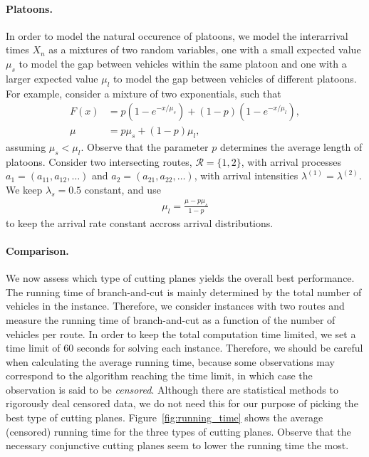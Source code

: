 \documentclass[a4paper]{report}
\theoremstyle{definition}
\theoremstyle{plain}
\begin{document}
\paragraph{Platoons.}
In order to model the natural occurence of platoons, we model the interarrival
times $X_{n}$ as a mixtures of two random variables, one with a small expected
value $\mu_{s}$ to model the gap between vehicles within the same platoon and one
with a larger expected value $\mu_{l}$ to model the gap between vehicles of
different platoons. For example, consider a mixture of two exponentials, such
that
\begin{align*}
  F(x) &= p ( 1 - e^{-x / \mu_{s}} ) + (1 - p) (1 - e^{-x / \mu_{l}}) , \\[0.2em]
  \mu &= p \mu_{s} + (1-p) \mu_{l} ,
\end{align*}
%
assuming $\mu_{s} < \mu_{l}$. Observe that the parameter $p$ determines
the average length of platoons.
%
Consider two intersecting routes, $\mathcal{R} = \{1, 2\}$, with arrival processes
$a_{1} = (a_{11}, a_{12}, \dots)$ and $a_{2} = (a_{21}, a_{22}, \dots)$, with
arrival intensities $\lambda^{(1)} = \lambda^{(2)}$.
%
We keep $\lambda_{s} = 0.5$ constant, and use
\begin{align*}
  \mu_{l}  = \frac{\mu - p \mu_{s}}{1 - p}
\end{align*}
to keep the arrival rate constant accross arrival distributions.

\paragraph{Comparison.}
We now assess which type of cutting planes yields the overall best performance.
The running time of branch-and-cut is mainly determined by the total number of
vehicles in the instance. Therefore, we consider instances with two routes and
measure the running time of branch-and-cut as a function of the number of
vehicles per route.
%
In order to keep the total computation time limited, we set a time limit of 60
seconds for solving each instance. Therefore, we should be careful when
calculating the average running time, because some observations may correspond
to the algorithm reaching the time limit, in which case the observation is said
to be \textit{censored}. Although there are statistical methods to rigorously
deal censored data, we do not need this for our purpose of picking the best type
of cutting planes.
%
Figure~\ref{fig:running_time} shows the average (censored) running time for the
three types of cutting planes. Observe that the necessary conjunctive cutting
planes seem to lower the running time the most.
\end{document}
